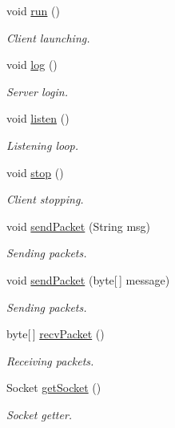\begin{DoxyCompactItemize}
\item 
void \hyperlink{classcom_1_1mobii_1_1connection_1_1_tcp_client_a722057d8962863a4e79c57ec52d9dbe2}{run} ()
\begin{DoxyCompactList}\small\item\em Client launching. \end{DoxyCompactList}\item 
void \hyperlink{classcom_1_1mobii_1_1connection_1_1_tcp_client_af3f5cc1194c8fd7fd110d95b6da87d55}{log} ()
\begin{DoxyCompactList}\small\item\em Server login. \end{DoxyCompactList}\item 
void \hyperlink{classcom_1_1mobii_1_1connection_1_1_tcp_client_a1b85821f03bf92a9df0eaf6fc2684945}{listen} ()
\begin{DoxyCompactList}\small\item\em Listening loop. \end{DoxyCompactList}\item 
void \hyperlink{classcom_1_1mobii_1_1connection_1_1_tcp_client_a807b781f95589150d5ec635d63bce730}{stop} ()
\begin{DoxyCompactList}\small\item\em Client stopping. \end{DoxyCompactList}\item 
void \hyperlink{classcom_1_1mobii_1_1connection_1_1_tcp_client_a41b2d6a594948821d91bec6826ba4f77}{send\-Packet} (String msg)
\begin{DoxyCompactList}\small\item\em Sending packets. \end{DoxyCompactList}\item 
void \hyperlink{classcom_1_1mobii_1_1connection_1_1_tcp_client_aca4606f66eb752e63de2035f45fd1015}{send\-Packet} (byte\mbox{[}$\,$\mbox{]} message)
\begin{DoxyCompactList}\small\item\em Sending packets. \end{DoxyCompactList}\item 
byte\mbox{[}$\,$\mbox{]} \hyperlink{classcom_1_1mobii_1_1connection_1_1_tcp_client_a8835250a0db119098cc5aa2242e6fe41}{recv\-Packet} ()
\begin{DoxyCompactList}\small\item\em Receiving packets. \end{DoxyCompactList}\item 
Socket \hyperlink{classcom_1_1mobii_1_1connection_1_1_tcp_client_a8f29b3af7d4b6035b8da85254052db92}{get\-Socket} ()
\begin{DoxyCompactList}\small\item\em Socket getter. \end{DoxyCompactList}\end{DoxyCompactItemize}
